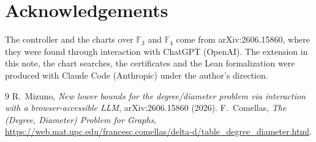 \documentclass[11pt]{article}
\theoremstyle{definition}
\theoremstyle{remark}
\newcommand{\F}{\mathbb{F}}
\begin{document}
\section*{Acknowledgements}
The controller and the charts over $\F_3$ and $\F_4$ come from
arXiv:2606.15860, where they were found through interaction with ChatGPT
(OpenAI). The extension in this note, the chart searches, the certificates and
the Lean formalization were produced with Claude Code (Anthropic) under the
author's direction.

\begin{thebibliography}{9}
 R.~Mizuno, \emph{New lower bounds for the degree/diameter problem
via interaction with a browser-accessible LLM}, arXiv:2606.15860 (2026).
 F.~Comellas, \emph{The (Degree, Diameter) Problem for Graphs},
\url{https://web.mat.upc.edu/francesc.comellas/delta-d/table_degree_diameter.html}.
\end{thebibliography}
\end{document}
